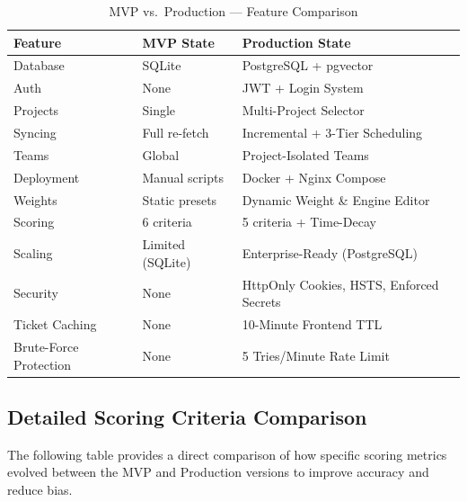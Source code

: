 \documentclass[12pt, a4paper]{article}
\begin{document}
\begin{table}[H]
\centering
\caption{MVP vs.\ Production — Feature Comparison}
\begin{tabularx}{\textwidth}{|l|X|X|}
\hline
\textbf{Feature} & \textbf{MVP State} & \textbf{Production State} \\
\hline
Database      & SQLite                  & PostgreSQL + pgvector \\
Auth          & None                    & JWT + Login System \\
Projects      & Single                  & Multi-Project Selector \\
Syncing       & Full re-fetch           & Incremental + 3-Tier Scheduling \\
Teams         & Global                  & Project-Isolated Teams \\
Deployment    & Manual scripts          & Docker + Nginx Compose \\
Weights       & Static presets          & Dynamic Weight \& Engine Editor \\
Scoring       & 6 criteria              & 5 criteria + Time-Decay \\
Scaling       & Limited (SQLite)        & Enterprise-Ready (PostgreSQL) \\
Security      & None                    & HttpOnly Cookies, HSTS, Enforced Secrets \\
Ticket Caching & None                    & 10-Minute Frontend TTL \\
Brute-Force Protection & None                    & 5 Tries/Minute Rate Limit \\
\hline
\end{tabularx}
\end{table}

\subsection{Detailed Scoring Criteria Comparison}

The following table provides a direct comparison of how specific scoring metrics evolved between the MVP and Production versions to improve accuracy and reduce bias.
\end{document}
